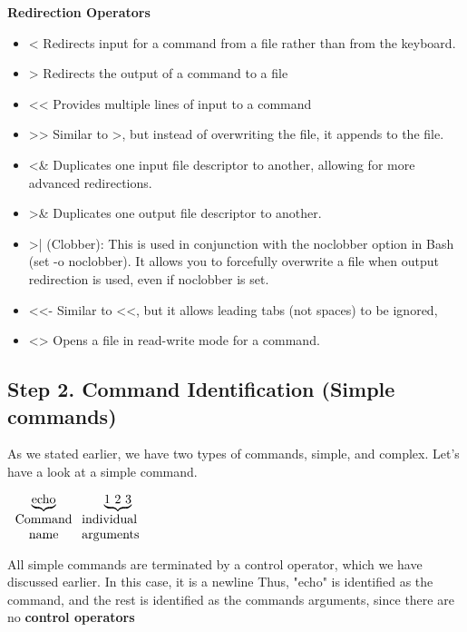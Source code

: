 \documentclass{report}
\begin{document}
   \begin{minipage}[t]{0.5\textwidth}
       \textbf{Redirection Operators}
       \begin{itemize}
           \item < Redirects input for a command from a file rather than from the keyboard.
            \item > Redirects the output of a command to a file
            \item << Provides multiple lines of input to a command 
            \item >> Similar to >, but instead of overwriting the file, it appends to the file.
            \item <\& Duplicates one input file descriptor to another, allowing for more advanced redirections.
            \item >\& Duplicates one output file descriptor to another.
            \item >| (Clobber): This is used in conjunction with the noclobber option in Bash (set -o noclobber). It allows you to forcefully overwrite a file when output redirection is used, even if noclobber is set.
            \item <<- Similar to <<, but it allows leading tabs (not spaces) to be ignored, 
            \item <>  Opens a file in read-write mode for a command. 
       \end{itemize}
   \end{minipage}

   \pagebreak \bigbreak \noindent 
   \subsection{Step 2. Command Identification (Simple commands)}
   \bigbreak \noindent 
   As we stated earlier, we have two types of commands, simple, and complex. Let's have a look at a simple command.
   \bigbreak \noindent 
   \begin{center}
       $\underbrace{\text{echo}}_{\parbox{2cm}{\centering \text{Command}\\ \text{name}}} \underbrace{1\ 2\ 3}_{\parbox{2cm}{individual arguments}}$
   \end{center}
   \bigbreak \noindent 
   All simple commands are terminated by a control operator, which we have discussed earlier. In this case, it is a newline
   \bigbreak \noindent 
   Thus, "echo" is identified as the command, and the rest is identified as the commands arguments, since there are no \textbf{control operators}
\end{document}
